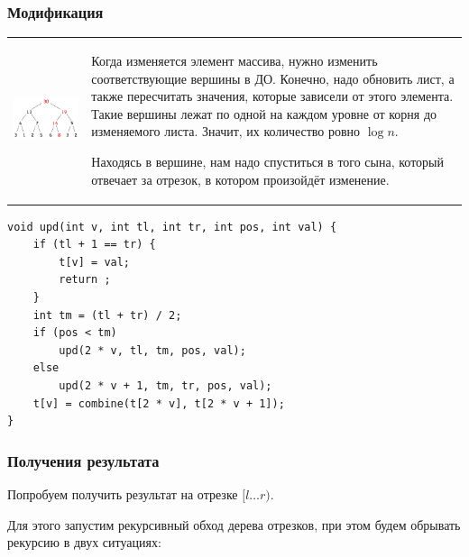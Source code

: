 \subsubsection{Модификация}

\down
\begin{tabular}{cm{}}
	\begin{minipage}{4cm}	
		\includegraphics[scale=0.5]{files/set_example.png}
	\end{minipage}
	&
	Когда изменяется элемент массива, нужно изменить соответствующие вершины в ДО. Конечно, надо обновить лист, а также пересчитать значения, которые зависели от этого элемента. Такие вершины лежат по одной на каждом уровне от корня до изменяемого листа. Значит, их количество ровно $\log n$.
	
	Находясь в вершине, нам надо спуститься в того сына, который отвечает за отрезок, в котором произойдёт изменение.
\end{tabular}
\down
\up \up
\begin{verbatim}
void upd(int v, int tl, int tr, int pos, int val) {
	if (tl + 1 == tr) {
		t[v] = val;
		return ;
	}
	int tm = (tl + tr) / 2;
	if (pos < tm)
	    upd(2 * v, tl, tm, pos, val);
	else
	    upd(2 * v + 1, tm, tr, pos, val);
	t[v] = combine(t[2 * v], t[2 * v + 1]);
}
\end{verbatim}

\pagebreak

\subsubsection{Получения результата}

Попробуем получить результат на отрезке $[l \ldots r)$.

Для этого запустим рекурсивный обход дерева отрезков, при этом будем обрывать рекурсию в двух ситуациях:

